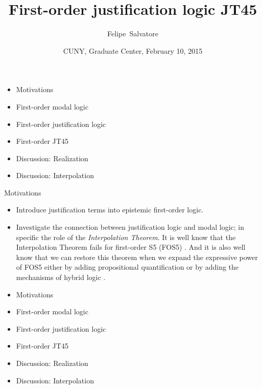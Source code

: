\documentclass{beamer}
\title[First-order justification logic JT45] 
{First-order justification logic JT45}
\author[F.Salvatore] 
{Felipe~Salvatore\inst{1}}
\institute[Universities of Somewhere and Elsewhere] 
{
	\inst{1}%
	graduate student in Philosophy\\
	University of São Paulo}
\date[CUNY 2015] 
{CUNY, Graduate Center, February 10, 2015}
\theoremstyle{definition}
\begin{document}
	
\begin{frame}
\titlepage 
\end{frame}


\begin{frame}
	\begin{itemize}
	\item[] {\color{blue}Motivations}
	\vspace{5mm}
	\item[] First-order modal logic
	\vspace{5mm}
	\item[] First-order justification logic
	\vspace{5mm}
	\item[] First-order JT45
	\vspace{5mm}
	\item[] Discussion: Realization
	\vspace{5mm}
	\item[] Discussion: Interpolation
	\end{itemize} 
\end{frame}

	

\begin{frame}{Motivations}

	
\begin{itemize}
\item Introduce justification terms into epistemic first-order logic.
\vspace{5mm}
\item Investigate the connection between justification logic and modal logic; in specific the role of the \textit{Interpolation Theorem}. It is well know that the Interpolation Theorem fails for first-order S5 (FOS5) \cite{Fine79}. And it is also well know that we can restore this theorem when we expand the expressive power of FOS5 either by adding propositional quantification \cite{Fitting02} or by adding the mechanisms of hybrid logic \cite{Areces01}.
\end{itemize}
\end{frame}

\begin{frame}
	\begin{itemize}
	\item[] Motivations
	\vspace{5mm}	
	\item[] {\color{blue}First-order modal logic}
	\vspace{5mm}
	\item[] First-order justification logic
	\vspace{5mm}
	\item[] First-order JT45
	\vspace{5mm}
	\item[] Discussion: Realization
	\vspace{5mm}
	\item[] Discussion: Interpolation
	\end{itemize} 
\end{frame}
\end{document}
